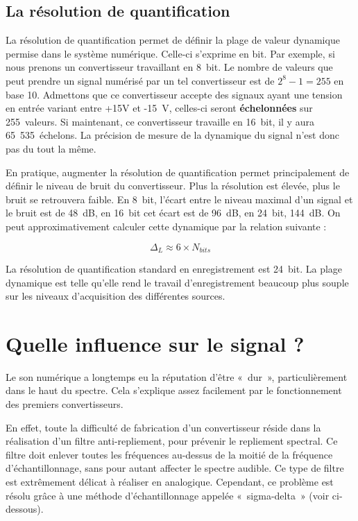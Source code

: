 \documentclass[
  letterpaper,
  DIV=11,
  numbers=noendperiod]{scrreprt}
\begin{document}
\hypertarget{la-ruxe9solution-de-quantification}{%
\subsection{La résolution de
quantification}\label{la-ruxe9solution-de-quantification}}

La résolution de quantification permet de définir la plage de valeur
dynamique permise dans le système numérique. Celle-ci s'exprime en bit.
Par exemple, si nous prenons un convertisseur travaillant en 8~bit. Le
nombre de valeurs que peut prendre un signal numérisé par un tel
convertisseur est de \(2^8-1 = 255\) en base 10. Admettons que ce
convertisseur accepte des signaux ayant une tension en entrée variant
entre +15V et -15~V, celles-ci seront \textbf{échelonnées} sur
255~valeurs. Si maintenant, ce convertisseur travaille en 16~bit, il y
aura 65~535~échelons. La précision de mesure de la dynamique du signal
n'est donc pas du tout la même.

En pratique, augmenter la résolution de quantification permet
principalement de définir le niveau de bruit du convertisseur. Plus la
résolution est élevée, plus le bruit se retrouvera faible. En 8~bit,
l'écart entre le niveau maximal d'un signal et le bruit est de 48~dB, en
16~bit cet écart est de 96~dB, en 24~bit, 144~dB. On peut
approximativement calculer cette dynamique par la relation suivante :

\[ \Delta_L \approx 6 \times N_{bits} \]

La résolution de quantification standard en enregistrement est 24~bit.
La plage dynamique est telle qu'elle rend le travail d'enregistrement
beaucoup plus souple sur les niveaux d'acquisition des différentes
sources.

\hypertarget{quelle-influence-sur-le-signal}{%
\section{Quelle influence sur le signal
?}\label{quelle-influence-sur-le-signal}}

Le son numérique a longtemps eu la réputation d'être «~dur~»,
particulièrement dans le haut du spectre. Cela s'explique assez
facilement par le fonctionnement des premiers convertisseurs.

En effet, toute la difficulté de fabrication d'un convertisseur réside
dans la réalisation d'un filtre anti-repliement, pour prévenir le
repliement spectral. Ce filtre doit enlever toutes les fréquences
au-dessus de la moitié de la fréquence d'échantillonnage, sans pour
autant affecter le spectre audible. Ce type de filtre est extrêmement
délicat à réaliser en analogique. Cependant, ce problème est résolu
grâce à une méthode d'échantillonnage appelée «~sigma-delta~» (voir
ci-dessous).
\end{document}
